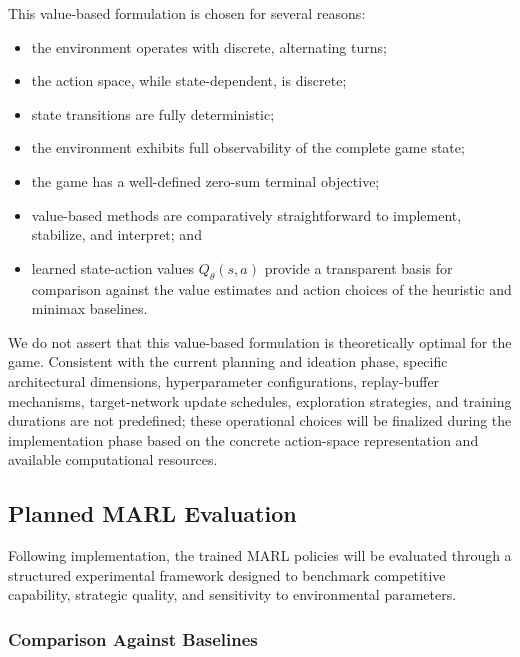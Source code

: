 \documentclass{article}
\begin{document}
This value-based formulation is chosen for several reasons:
\begin{itemize}
    \item the environment operates with discrete, alternating turns;
    \item the action space, while state-dependent, is discrete;
    \item state transitions are fully deterministic;
    \item the environment exhibits full observability of the complete game state;
    \item the game has a well-defined zero-sum terminal objective;
    \item value-based methods are comparatively straightforward to implement, stabilize, and interpret; and
    \item learned state-action values $Q_\theta(s, a)$ provide a transparent basis for comparison against the value estimates and action choices of the heuristic and minimax baselines.
\end{itemize}
We do not assert that this value-based formulation is theoretically optimal for the game. Consistent with the current planning and ideation phase, specific architectural dimensions, hyperparameter configurations, replay-buffer mechanisms, target-network update schedules, exploration strategies, and training durations are not predefined; these operational choices will be finalized during the implementation phase based on the concrete action-space representation and available computational resources.

\subsection{Planned MARL Evaluation}
\label{subsec:planned_marl_eval}

Following implementation, the trained MARL policies will be evaluated through a structured experimental framework designed to benchmark competitive capability, strategic quality, and sensitivity to environmental parameters.

\subsubsection{Comparison Against Baselines}
\label{subsubsec:eval_baselines}
\end{document}
